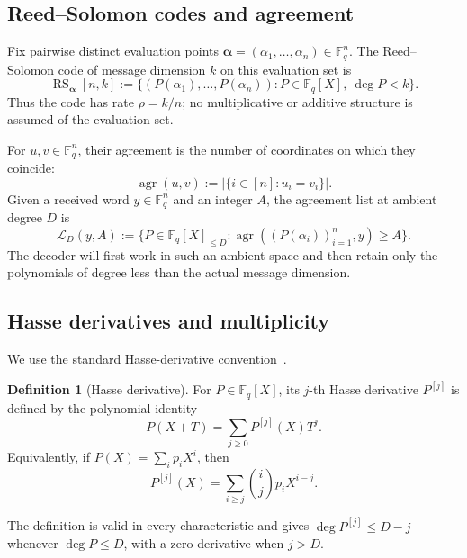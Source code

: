 \documentclass[11pt,letterpaper]{article}
\theoremstyle{definition}
\newtheorem{definition}[definition]{Definition}
\newcommand{\F}{\mathbb{F}}
\newcommand{\RS}{\operatorname{RS}}
\newcommand{\agree}{\operatorname{agr}}
\newcommand{\List}{\mathcal{L}}
\begin{document}
\subsection{Reed--Solomon codes and agreement}

Fix pairwise distinct evaluation points
\(\boldsymbol{\alpha}=(\alpha_1,\ldots,\alpha_n)\in\F_q^n\).  The Reed--Solomon
code of message dimension \(k\) on this evaluation set is
\begin{equation}
  \RS_{\boldsymbol{\alpha}}[n,k]
  :=
  \bigl\{
    (P(\alpha_1),\ldots,P(\alpha_n)):
    P\in\F_q[X],\ \deg P<k
  \bigr\}.
  \label{eq:rs-code}
\end{equation}
Thus the code has rate \(\rho=k/n\); no multiplicative or additive structure is
assumed of the evaluation set.

For \(u,v\in\F_q^n\), their agreement is the number of coordinates on which
they coincide:
\begin{equation}
  \agree(u,v):=\bigl|\{i\in[n]:u_i=v_i\}\bigr|.
  \label{eq:agreement}
\end{equation}
Given a received word \(y\in\F_q^n\) and an integer \(A\), the agreement list
at ambient degree \(D\) is
\begin{equation}
  \List_D(y,A)
  :=
  \bigl\{
    P\in\F_q[X]_{\leq D}:
    \agree((P(\alpha_i))_{i=1}^n,y)\geq A
  \bigr\}.
  \label{eq:agreement-list}
\end{equation}
The decoder will first work in such an ambient space and then retain only the
polynomials of degree less than the actual message dimension.

\subsection{Hasse derivatives and multiplicity}

We use the standard Hasse-derivative convention~\cite{DKSS13}.

\begin{definition}[Hasse derivative]
\label{def:hasse-derivative}
For \(P\in\F_q[X]\), its \(j\)-th Hasse derivative \(P^{[j]}\) is defined by
the polynomial identity
\begin{equation}
  P(X+T)=\sum_{j\geq 0}P^{[j]}(X)T^j.
  \label{eq:hasse-taylor}
\end{equation}
Equivalently, if \(P(X)=\sum_i p_iX^i\), then
\begin{equation}
  P^{[j]}(X)=\sum_{i\geq j}\binom{i}{j}p_iX^{i-j}.
  \label{eq:hasse-coefficients}
\end{equation}
\end{definition}
The definition is valid in every characteristic and gives
\(\deg P^{[j]}\leq D-j\) whenever \(\deg P\leq D\), with a zero derivative
when \(j>D\).
\end{document}
